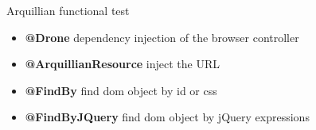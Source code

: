 \begin{frame}{Arquillian functional test}
  
 \begin{itemize}
 	\item {\textbf{@Drone}} dependency injection of the browser controller
 	\item {\textbf{@ArquillianResource}} inject the URL 
 	\item {\textbf{@FindBy}} find dom object by id or css
 	\item {\textbf{@FindByJQuery}} find dom object by jQuery expressions
 \end{itemize}
\end{frame}

